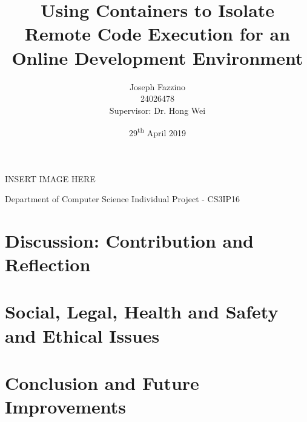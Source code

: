 \documentclass[12pt, a4paper]{extreport}
\title{Using Containers to Isolate Remote Code Execution for an Online Development Environment}
\author{
    Joseph Fazzino\\
    24026478\\
    [4cm]{Supervisor: Dr. Hong Wei}
}
\date{29\textsuperscript{th} April 2019}
\begin{document}
INSERT IMAGE HERE

Department of Computer Science Individual Project - CS3IP16

\maketitle





\tableofcontents
\pagebreak


















\chapter{Discussion: Contribution and Reflection}
\pagebreak


\chapter{Social, Legal, Health and Safety and Ethical Issues}
\pagebreak


\chapter{Conclusion and Future Improvements}
\pagebreak




\pagebreak


\end{document}
